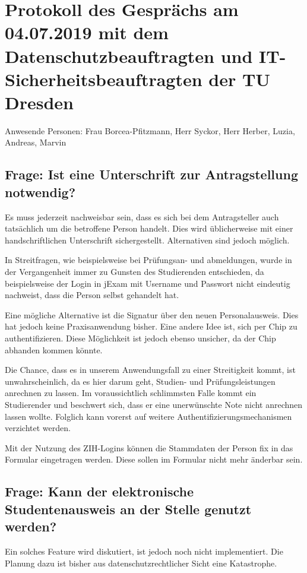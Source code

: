 \documentclass[ngerman]{tudscrreprt}
\begin{document}
\chapter{Protokoll des Gesprächs am 04.07.2019 mit dem Datenschutzbeauftragten und IT-Sicherheitsbeauftragten der TU Dresden}

Anwesende Personen: Frau Borcea-Pfitzmann, Herr Syckor, Herr Herber, Luzia, Andreas, Marvin

\section{Frage: Ist eine Unterschrift zur Antragstellung notwendig?}

Es muss jederzeit nachweisbar sein, dass es sich bei dem Antragsteller auch tatsächlich um die betroffene Person handelt. Dies wird üblicherweise mit einer handschriftlichen Unterschrift sichergestellt. Alternativen sind jedoch möglich.

In Streitfragen, wie beispielsweise bei Prüfungsan- und abmeldungen, wurde in der Vergangenheit immer zu Gunsten des Studierenden entschieden, da beispielsweise der Login in jExam mit Username und Passwort nicht eindeutig nachweist, dass die Person selbst gehandelt hat.

Eine mögliche Alternative ist die Signatur über den neuen Personalausweis. Dies hat jedoch keine Praxisanwendung bisher.
Eine andere Idee ist, sich per Chip zu authentifizieren. Diese Möglichkeit ist jedoch ebenso unsicher, da der Chip abhanden kommen könnte.

Die Chance, dass es in unserem Anwendungsfall zu einer Streitigkeit kommt, ist unwahrscheinlich, da es hier darum geht, Studien- und Prüfungsleistungen anrechnen zu lassen. Im voraussichtlich schlimmsten Falle kommt ein Studierender und beschwert sich, dass er eine unerwünschte Note nicht anrechnen lassen wollte. Folglich kann vorerst auf weitere Authentifizierungsmechanismen verzichtet werden.

Mit der Nutzung des ZIH-Logins können die Stammdaten der Person fix in das Formular eingetragen werden. Diese sollen im Formular nicht mehr änderbar sein.

\section{Frage: Kann der elektronische Studentenausweis an der Stelle genutzt werden?}

Ein solches Feature wird diskutiert, ist jedoch noch nicht implementiert. Die Planung dazu ist bisher aus datenschutzrechtlicher Sicht eine Katastrophe.
\end{document}
